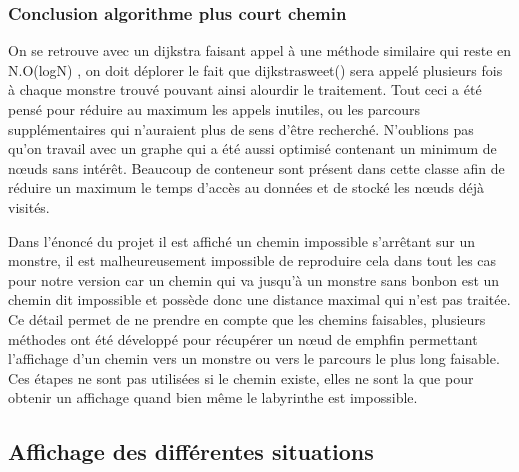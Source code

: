 \documentclass[12pt, oneside]{article}
\begin{document}
\subsubsection{Conclusion algorithme plus court chemin}
On se retrouve avec un dijkstra faisant appel à une méthode similaire qui reste en N.O(logN) , on doit déplorer le fait que dijkstra\textunderscore sweet() sera appelé plusieurs fois à chaque monstre trouvé pouvant ainsi alourdir le traitement. Tout ceci a été pensé pour réduire au maximum les appels inutiles, ou les parcours supplémentaires qui n’auraient plus de sens d’être recherché. N’oublions pas qu’on travail avec un graphe qui a été aussi optimisé contenant un minimum de nœuds sans intérêt. Beaucoup de conteneur sont présent dans cette classe afin de réduire un maximum le temps d’accès au données et de stocké les nœuds déjà visités. 

Dans l’énoncé du projet il est affiché un chemin impossible s’arrêtant sur un monstre, il est malheureusement impossible de reproduire cela dans tout les cas pour notre version car un chemin qui va jusqu’à un monstre sans bonbon est un chemin dit impossible et possède donc une distance maximal qui n’est pas traitée. Ce détail permet de ne prendre en compte que les chemins faisables, plusieurs méthodes ont été développé pour récupérer un nœud de emph{fin} permettant l’affichage d’un chemin vers un monstre ou vers le parcours le plus long faisable. Ces étapes ne sont pas utilisées si le chemin existe, elles ne sont la que pour obtenir un affichage quand bien même le labyrinthe est impossible. 
\subsection{Affichage des différentes situations}
\label{situation}
\end{document}
